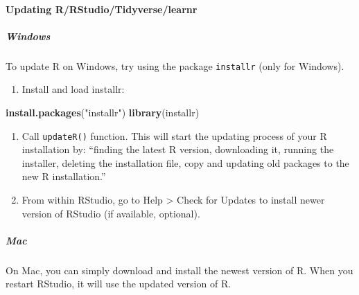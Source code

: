 \documentclass[]{article}
\newenvironment{Shaded}{\begin{snugshade}}{\end{snugshade}}
\newcommand{\KeywordTok}[1]{\textcolor[rgb]{0.13,0.29,0.53}{\textbf{#1}}}
\newcommand{\NormalTok}[1]{#1}
\newcommand{\StringTok}[1]{\textcolor[rgb]{0.31,0.60,0.02}{#1}}
\providecommand{\tightlist}{%
  \setlength{\itemsep}{0pt}\setlength{\parskip}{0pt}}
\let\oldparagraph\paragraph
\renewcommand{\paragraph}[1]{\oldparagraph{#1}\mbox{}}
\let\oldsubparagraph\subparagraph
\renewcommand{\subparagraph}[1]{\oldsubparagraph{#1}\mbox{}}
\begin{document}
\hypertarget{updating-rrstudiotidyverselearnr}{%
\paragraph{Updating
R/RStudio/Tidyverse/learnr}\label{updating-rrstudiotidyverselearnr}}

\hypertarget{windows-1}{%
\subparagraph{Windows}\label{windows-1}}

To update R on Windows, try using the package \texttt{installr} (only
for Windows).

\begin{enumerate}
\def\labelenumi{\arabic{enumi}.}
\tightlist
\item
  Install and load installr:
\end{enumerate}

\begin{Shaded}
\begin{Highlighting}[]
\KeywordTok{install.packages}\NormalTok{(}\StringTok{"installr"}\NormalTok{)}
\KeywordTok{library}\NormalTok{(installr)}
\end{Highlighting}
\end{Shaded}

\begin{enumerate}
\def\labelenumi{\arabic{enumi}.}
\setcounter{enumi}{1}
\tightlist
\item
  Call \texttt{updateR()} function. This will start the updating process
  of your R installation by: ``finding the latest R version, downloading
  it, running the installer, deleting the installation file, copy and
  updating old packages to the new R installation.''\\
\item
  From within RStudio, go to Help \textgreater{} Check for Updates to
  install newer version of RStudio (if available, optional).
\end{enumerate}

\hypertarget{mac-1}{%
\subparagraph{Mac}\label{mac-1}}

On Mac, you can simply download and install the newest version of R.
When you restart RStudio, it will use the updated version of R.
\end{document}
